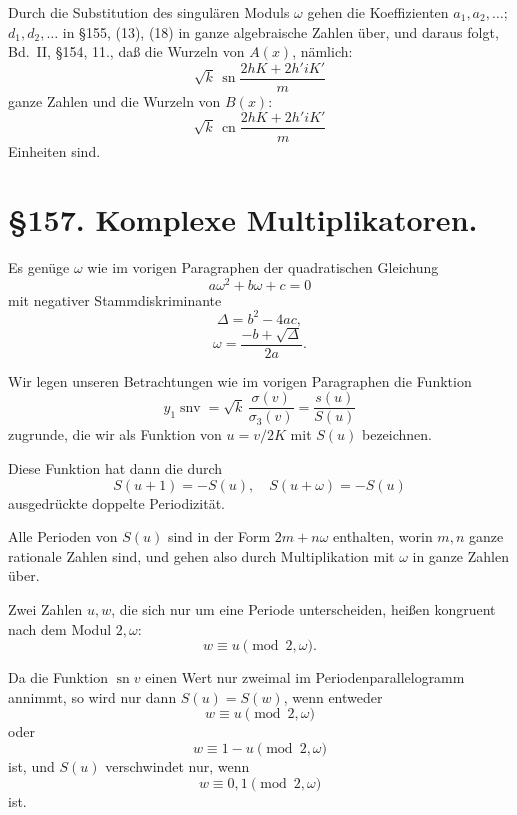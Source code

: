 \documentclass[12pt,a4paper]{article}
\begin{document}
Durch die Substitution des singul\"aren Moduls $\omega$ gehen die Koeffizienten $a_1, a_2, \ldots$; $d_1, d_2, \ldots$ in \S 155, (13), (18) in ganze algebraische Zahlen \"uber, und daraus folgt, Bd.~II, \S 154, 11., da\ss{} die Wurzeln von $A(x)$, n\"amlich:
\begin{equation}\sqrt{k} \, \operatorname{sn} \frac{2hK + 2h'iK'}{m}\end{equation}
ganze Zahlen und die Wurzeln von $B(x)$:
\begin{equation}\sqrt{k} \, \operatorname{cn} \frac{2hK + 2h'iK'}{m}\end{equation}
Einheiten sind.

\section*{\S 157. Komplexe Multiplikatoren.}

Es gen\"uge $\omega$ wie im vorigen Paragraphen der quadratischen Gleichung
\begin{equation}a\omega^2 + b\omega + c = 0\end{equation}
mit negativer Stammdiskriminante
\begin{equation}\Delta = b^2 - 4ac,\end{equation}
\[\omega = \frac{-b + \sqrt{\Delta}}{2a}.\]

Wir legen unseren Betrachtungen wie im vorigen Paragraphen die Funktion
\begin{equation}y_1 \operatorname{snv} = \sqrt{k} \, \frac{\sigma(v)}{\sigma_3(v)} = \frac{s(u)}{S(u)}\end{equation}
zugrunde, die wir als Funktion von $u = v/2K$ mit $S(u)$ bezeichnen.

Diese Funktion hat dann die durch
\begin{equation}S(u+1) = -S(u), \quad S(u+\omega) = -S(u)\end{equation}
ausgedr\"uckte doppelte Periodizit\"at.

Alle Perioden von $S(u)$ sind in der Form $2m + n\omega$ enthalten, worin $m, n$ ganze rationale Zahlen sind, und gehen also durch Multiplikation mit $\omega$ in ganze Zahlen \"uber.

Zwei Zahlen $u, w$, die sich nur um eine Periode unterscheiden, hei\ss{}en kongruent nach dem Modul $2, \omega$:
\[w \equiv u \pmod{2, \omega}.\]

Da die Funktion $\operatorname{sn} v$ einen Wert nur zweimal im Periodenparallelogramm annimmt, so wird nur dann $S(u) = S(w)$, wenn entweder
\begin{equation}w \equiv u \pmod{2, \omega}\end{equation}
oder
\[w \equiv 1 - u \pmod{2, \omega}\]
ist, und $S(u)$ verschwindet nur, wenn
\[w \equiv 0, 1 \pmod{2, \omega}\]
ist.
\end{document}
